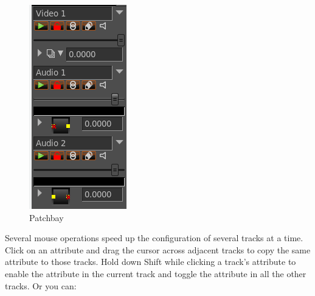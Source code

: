 \begin{figure}
    \vspace{-2ex}
    \centering
    \includegraphics[width=0.79\linewidth]{images/patchbay01.png}
    \caption{Patchbay}
    \label{fig:patchbay}
\end{figure}



Several mouse operations speed up the configuration of several tracks at a time. Click on an attribute and drag the cursor across adjacent tracks to copy the same attribute to those tracks.  Hold down Shift while clicking a track's attribute to enable the attribute in the current track and toggle the attribute in all the other tracks. Or you can:

